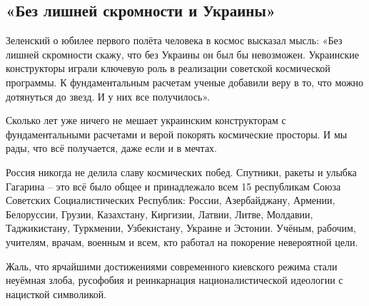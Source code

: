  
 
 
 
 

\subsection{«Без лишней скромности и Украины» }
\label{sec:12_04_2021.fb.zaharova_maria.1.gagarin_ukraina_korolev_zelja}

Зеленский о юбилее первого полёта человека в космос высказал  мысль: «Без
лишней скромности скажу, что без Украины он был бы невозможен. Украинские
конструкторы играли ключевую роль в реализации советской космической программы.
К фундаментальным расчетам ученые добавили веру в то, что можно дотянуться до
звезд. И у них все получилось».

Сколько лет уже ничего не мешает украинским конструкторам с фундаментальными
расчетами и верой покорять космические просторы. И мы рады, что всё получается,
даже если и в мечтах. 

Россия никогда не делила славу космических побед. Спутники, ракеты и улыбка
Гагарина – это всё было общее и принадлежало всем 15 республикам Союза
Советских Социалистических Республик: России, Азербайджану, Армении,
Белоруссии, Грузии, Казахстану, Киргизии, Латвии, Литве, Молдавии,
Таджикистану, Туркмении, Узбекистану, Украине и Эстонии. Учёным, рабочим,
учителям, врачам, военным и всем, кто работал на покорение невероятной цели. 

Жаль, что ярчайшими достижениями современного  киевского  режима стали неуёмная
злоба, русофобия и реинкарнация националистической идеологии с нацисткой
символикой.
